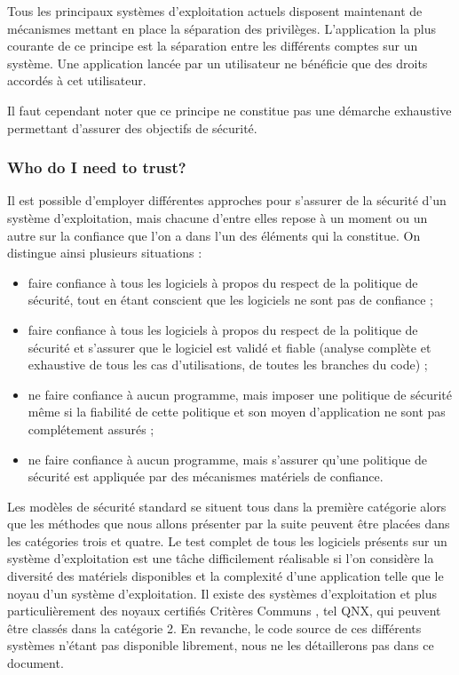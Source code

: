 \documentclass[pdftex,a4paper,titlepage,11pt]{article}
\begin{document}
Tous les principaux systèmes d'exploitation actuels disposent maintenant de mécanismes mettant en place la séparation des privilèges. L'application la plus courante de ce principe est la séparation entre les différents comptes sur un système. Une application lancée par un utilisateur ne bénéficie que des droits accordés à cet utilisateur.

Il faut cependant noter que ce principe ne constitue pas une démarche exhaustive permettant d'assurer des objectifs de sécurité.

\subsubsection{Who do I need to trust?}

Il est possible d'employer différentes approches pour s'assurer de la sécurité d'un système d'exploitation, mais chacune d'entre elles repose à un moment ou un autre sur la confiance que l'on a dans l'un des éléments qui la constitue. On distingue ainsi plusieurs situations \cite{WCS}:

\begin{itemize}
  \item faire confiance à tous les logiciels à propos du respect de la politique de sécurité, tout en étant conscient que les logiciels ne sont pas de confiance ;%
  \item faire confiance à tous les logiciels à propos du respect de la politique de sécurité et s'assurer que le logiciel est validé et fiable (analyse complète et exhaustive de tous les cas d'utilisations, de toutes les branches du code) ;%
  \item ne faire confiance à aucun programme, mais imposer une politique de sécurité même si la fiabilité de cette politique et son moyen d'application ne sont pas complétement assurés ;%
  \item ne faire confiance à aucun programme, mais s'assurer qu'une politique de sécurité est appliquée par des mécanismes matériels de confiance.%
\end{itemize}

Les modèles de sécurité standard se situent tous dans la première catégorie alors que les méthodes que nous allons présenter par la suite peuvent être placées dans les catégories trois et quatre. Le test complet de tous les logiciels présents sur un système d'exploitation est une tâche difficilement réalisable si l'on considère la diversité des matériels disponibles et la complexité d'une application telle que le noyau d'un système d'exploitation. Il existe des systèmes d'exploitation et plus particulièrement des noyaux certifiés Critères Communs \cite{CCCERT}, tel QNX\cite{QNX}, qui peuvent être classés dans la catégorie 2. En revanche, le code source de ces différents systèmes n'étant pas disponible librement, nous ne les détaillerons pas dans ce document.
\end{document}
